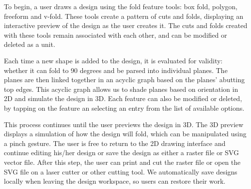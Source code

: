 To begin, a user draws a design using the fold feature tools: box fold,
polygon, freeform and v-fold. These tools create a pattern of cuts and
folds, displaying an interactive preview of the design as the user
creates it. The cuts and folds created with these tools remain
associated with each other, and can be modified or deleted as a unit.

Each time a new shape is added to the design, it is evaluated for
validity: whether it can fold to 90 degrees and be parsed into
individual planes. The planes are then linked together in an acyclic
graph based on the planes' abutting top edges. This acyclic graph allows
us to shade planes based on orientation in 2D and simulate the design in
3D. Each feature can also be modified or deleted, by tapping on the
feature an selecting an entry from the list of available options.

This process continues until the user previews the design in 3D. The 3D
preview displays a simulation of how the design will fold, which can be
manipulated using a pinch gesture. The user is free to return to the 2D
drawing interface and continue editing his/her design or save the design
as either a raster file or SVG vector file. After this step, the user
can print and cut the raster file or open the SVG file on a laser cutter
or other cutting tool. We automatically save designs locally when
leaving the design workspace, so users can restore their work.
